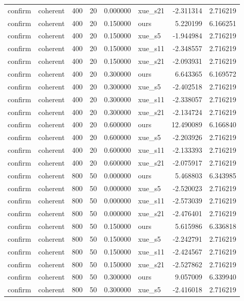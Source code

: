 \begin{longtable}{llrrrlrr}
confirm & coherent & 400 & 20 & 0.000000 & xue\_s21 & -2.311314 & 2.716219 \\
confirm & coherent & 400 & 20 & 0.150000 & ours & 5.220199 & 6.166251 \\
confirm & coherent & 400 & 20 & 0.150000 & xue\_s5 & -1.944984 & 2.716219 \\
confirm & coherent & 400 & 20 & 0.150000 & xue\_s11 & -2.348557 & 2.716219 \\
confirm & coherent & 400 & 20 & 0.150000 & xue\_s21 & -2.093931 & 2.716219 \\
confirm & coherent & 400 & 20 & 0.300000 & ours & 6.643365 & 6.169572 \\
confirm & coherent & 400 & 20 & 0.300000 & xue\_s5 & -2.402518 & 2.716219 \\
confirm & coherent & 400 & 20 & 0.300000 & xue\_s11 & -2.338057 & 2.716219 \\
confirm & coherent & 400 & 20 & 0.300000 & xue\_s21 & -2.134724 & 2.716219 \\
confirm & coherent & 400 & 20 & 0.600000 & ours & 12.490089 & 6.166840 \\
confirm & coherent & 400 & 20 & 0.600000 & xue\_s5 & -2.203926 & 2.716219 \\
confirm & coherent & 400 & 20 & 0.600000 & xue\_s11 & -2.133393 & 2.716219 \\
confirm & coherent & 400 & 20 & 0.600000 & xue\_s21 & -2.075917 & 2.716219 \\
confirm & coherent & 800 & 50 & 0.000000 & ours & 5.468803 & 6.343985 \\
confirm & coherent & 800 & 50 & 0.000000 & xue\_s5 & -2.520023 & 2.716219 \\
confirm & coherent & 800 & 50 & 0.000000 & xue\_s11 & -2.573039 & 2.716219 \\
confirm & coherent & 800 & 50 & 0.000000 & xue\_s21 & -2.476401 & 2.716219 \\
confirm & coherent & 800 & 50 & 0.150000 & ours & 5.615986 & 6.336818 \\
confirm & coherent & 800 & 50 & 0.150000 & xue\_s5 & -2.242791 & 2.716219 \\
confirm & coherent & 800 & 50 & 0.150000 & xue\_s11 & -2.424567 & 2.716219 \\
confirm & coherent & 800 & 50 & 0.150000 & xue\_s21 & -2.527862 & 2.716219 \\
confirm & coherent & 800 & 50 & 0.300000 & ours & 9.057009 & 6.339940 \\
confirm & coherent & 800 & 50 & 0.300000 & xue\_s5 & -2.416018 & 2.716219 \\

\end{longtable}

